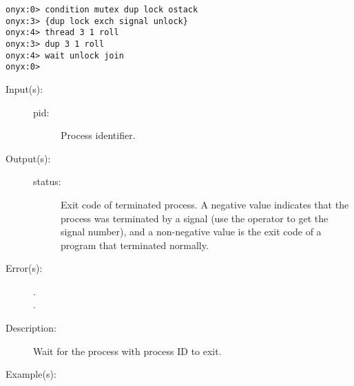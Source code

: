 \begin{description}
\begin{description}
\begin{verbatim}
onyx:0> condition mutex dup lock ostack
onyx:3> {dup lock exch signal unlock}
onyx:4> thread 3 1 roll
onyx:3> dup 3 1 roll
onyx:4> wait unlock join
onyx:0>
		\end{verbatim}
	\end{description}
\label{systemdict:waitpid}
\item[{\onyxop{pid}{waitpid}{status}}: ]
	\begin{description}\item[]
	\item[Input(s): ]
		\begin{description}\item[]
		\item[pid: ]
			Process identifier.
		\end{description}
	\item[Output(s): ]
		\begin{description}\item[]
		\item[status: ]
			Exit code of terminated process.  A negative value
			indicates that the process was terminated by a signal
			(use the 
			operator to get the signal number), and a non-negative
			value is the exit code of a program that terminated
			normally.
		\end{description}
	\item[Error(s): ]
		\begin{description}\item[]
		\item[.]
		\item[.]
		\end{description}
	\item[Description: ]
		Wait for the process with process ID  to exit.
	\item[Example(s): ]\begin{verbatim}


\end{verbatim}
\end{description}
\end{description}
